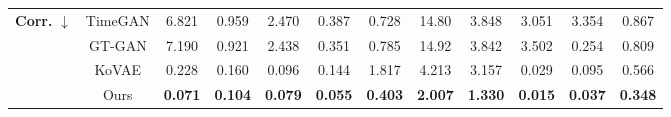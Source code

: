 \documentclass{article}
\theoremstyle{plain}
\theoremstyle{definition}
\theoremstyle{remark}
\begin{document}
\begin{table}[!t]
{\begin{tabular}{cc|cccccccccc}
    \multirow{4}{*}{\textbf{Corr.} $\downarrow$} 
      & TimeGAN 
         & 6.821 
         & 0.959 
         & 2.470 
         & 0.387 
         & 0.728
         & 14.80 
         & 3.848 
         & 3.051 
         & 3.354 
         & 0.867 \\
      & GT-GAN  
         & 7.190 
         & 0.921 
         & 2.438 
         & 0.351 
         & 0.785 
         & 14.92 
         & 3.842 
         & 3.502 
         & 0.254 
         & 0.809 \\
      & KoVAE   
         & 0.228 
         & 0.160 
         & 0.096 
         & 0.144 
         & 1.817 
         & 4.213 
         & 3.157 
         & 0.029 
         & 0.095 
         & 0.566 \\
      & Ours    
         & \cellcolor{blue!10}\textbf{0.071}
         & \cellcolor{blue!10}\textbf{0.104}
         & \cellcolor{blue!10}\textbf{0.079}
         & \cellcolor{blue!10}\textbf{0.055}
         & \cellcolor{blue!10}\textbf{0.403} 
         & \cellcolor{blue!10}\textbf{2.007}
         & \cellcolor{blue!10}\textbf{1.330}
         & \cellcolor{blue!10}\textbf{0.015}
         & \cellcolor{blue!10}\textbf{0.037}
         & \cellcolor{blue!10}\textbf{0.348} \\
    \bottomrule
\end{tabular}
}
\end{table}
\end{document}
